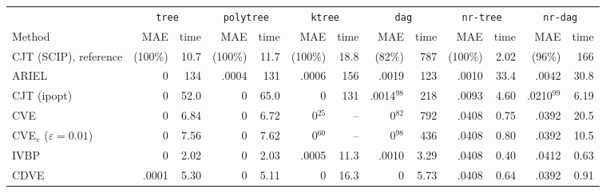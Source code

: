 \begin{tabular}{lrrrrrrrrrrrr}
\toprule
 & \multicolumn{2}{c}{\texttt{tree}} & \multicolumn{2}{c}{\texttt{polytree}} & \multicolumn{2}{c}{\texttt{ktree}} & \multicolumn{2}{c}{\texttt{dag}} & \multicolumn{2}{c}{\texttt{nr-tree}} & \multicolumn{2}{c}{\texttt{nr-dag}} \\
\cmidrule(lr){2-3}\cmidrule(lr){4-5}\cmidrule(lr){6-7}\cmidrule(lr){8-9}\cmidrule(lr){10-11}\cmidrule(lr){12-13}
Method & MAE & time & MAE & time & MAE & time & MAE & time & MAE & time & MAE & time \\
\midrule
CJT (SCIP), reference & (100\%) & 10.7 & (100\%) & 11.7 & (100\%) & 18.8 & (82\%) & 787 & (100\%) & 2.02 & (96\%) & 166 \\
ARIEL & 0 & 134 & .0004 & 131 & .0006 & 156 & .0019 & 123 & .0010 & 33.4 & .0042 & 30.8 \\
CJT (ipopt) & 0 & 52.0 & 0 & 65.0 & 0 & 131 & .0014$^{98}$ & 218 & .0093 & 4.60 & .0210$^{99}$ & 6.19 \\
CVE & 0 & 6.84 & 0 & 6.72 & 0$^{25}$ & -- & 0$^{82}$ & 792 & .0408 & 0.75 & .0392 & 20.5 \\
CVE$_\varepsilon$ ($\varepsilon{=}0.01$) & 0 & 7.56 & 0 & 7.62 & 0$^{60}$ & -- & 0$^{98}$ & 436 & .0408 & 0.80 & .0392 & 10.5 \\
IVBP & 0 & 2.02 & 0 & 2.03 & .0005 & 11.3 & .0010 & 3.29 & .0408 & 0.40 & .0412 & 0.63 \\
CDVE & .0001 & 5.30 & 0 & 5.11 & 0 & 16.3 & 0 & 5.73 & .0408 & 0.64 & .0392 & 0.91 \\
\bottomrule
\end{tabular}
